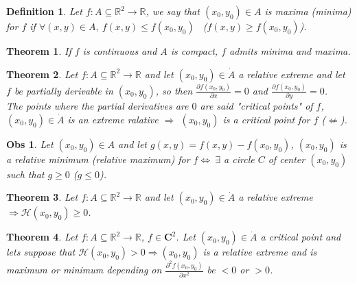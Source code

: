 \documentclass{article}
\newtheorem{theorem}{Theorem}
\newtheorem{observation}{Obs}
\newtheorem{definition}{Definition}
\begin{document}
        \begin{definition}
            Let $f : A \subseteq \mathbb{R}^2 \rightarrow \mathbb{R}$, we say that $(x_0,y_0) \in A$ is maxima (minima) for $f$ if $\forall (x,y) \in A, \ f(x,y) \leqslant f(x_0,y_0)$ \ ($f(x,y) \geqslant f(x_0,y_0)$). 
        \end{definition}
        \begin{theorem}
            If $f$ is continuous and $A$ is compact, $f$ admits minima and maxima.
        \end{theorem}
        \begin{theorem}
            Let $f : A \subseteq \mathbb{R}^2 \rightarrow \mathbb{R}$ and let $(x_0,y_0) \in \dot{A}$ a relative extreme and let  $f$ be partially derivable in $(x_0,y_0)$, so then $\frac{\partial f(x_0,y_0)}{\partial x} = 0$ and $\frac{\partial f(x_0,y_0)}{\partial y} = 0$. \\
            The points where the partial derivatives are $0$ are said "critical points" of $f$, $(x_0,y_0) \in \dot{A}$ is an extreme ralative $\Rightarrow$ $(x_0,y_0)$ is a critical point for $f$ ($\nLeftarrow$).         
        \end{theorem}
        \begin{observation}
            Let $(x_0,y_0) \in A$ and let $g(x,y) = f(x,y) - f(x_0,y_0)$, $(x_0,y_0)$ is a relative minimum (relative maximum) for $f \Longleftrightarrow \ \exists$ a circle $C$ of center $(x_0,y_0)$ such that $g \geq 0$ ($g \leq 0$).
        \end{observation}
        \begin{theorem}
            Let $f : A \subseteq \mathbb{R}^2 \rightarrow \mathbb{R}$ and let $(x_0,y_0) \in \dot{A}$ a relative extreme $\Longrightarrow \mathcal{H}(x_0,y_0) \geqslant 0$.
        \end{theorem}
        \begin{theorem}
            Let $f : A \subseteq \mathbb{R}^2 \rightarrow \mathbb{R}$, $f \in \mathbf{C}^2$. Let $(x_0,y_0) \in \dot{A}$ a critical point and lets suppose that $\mathcal{H}(x_0,y_0) > 0 \Longrightarrow (x_0,y_0)$ is a relative extreme and is maximum or minimum depending on $\frac{\partial^2 f(x_0,y_0)}{\partial x^2}$ be $<0$ or $>0$.  
        \end{theorem}
        \newpage
\end{document}
